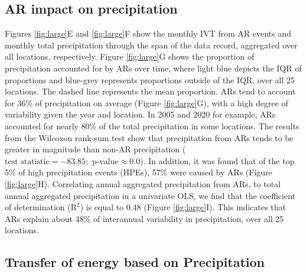 \documentclass[12pts,draft]{AR_analysis_}
\begin{document}
\subsection{AR impact on precipitation}

Figures \ref{fig:large}E and \ref{fig:large}F show the monthly IVT from 
AR events and monthly total precipitation through the span of the 
data record, aggregated over all locations, respectively. Figure \ref{fig:large}G
shows the proportion of precipitation accounted for by ARs over time, where 
light blue depicts the IQR of proportions and blue-grey represents 
proportions outside of the IQR, over all 25 locations. The dashed line 
represents the mean proportion.
ARs tend to account for 36\% of
precipitation on average (Figure \ref{fig:large}G), 
with a high degree of variability given
the year and location. In 2005 and 2020 for example, ARs accounted for nearly 
80\% of the total precipitation in some locations. The results 
from the Wilcoxon rank-sum test show that
precipitation from ARs tends to be greater in magnitude than non-AR 
precipitation
($\text{test statistic} = -83.85; \text{ p-value} \approx 0.0)$. In addition, it
was found that of the top 5\% of high precipitation events (HPEs), 57\% were
caused by ARs (Figure \ref{fig:large}H).
Correlating annual aggregated precipitation from ARs, to total annual
aggregated precipitation in a univariate OLS, we find that the
coefficient of determination ($\mathrm{R^{2}}$) is equal to 0.48 (Figure 
\ref{fig:large}I). This indicates that ARs
explain about 48\% of interannual variability in precipitation, 
over all 25 locations.  


\subsection{Transfer of energy based on Precipitation}
\end{document}
